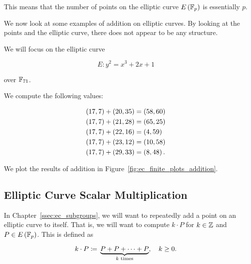 \noindent
This means that the number of points on the \gls{elliptic curve}
$E\left( \mathbb{F}_{p} \right)$ is essentially $p$.

We now look at some examples of addition on \glspl{elliptic curve}.
By looking at the points and the \gls{elliptic curve},
there does not appear to be any structure.

\begin{example}

We will focus on the \gls{elliptic curve}

\begin{equation}
    E: y^{2} = x^{3} + 2x + 1
\end{equation}

\noindent
over $\mathbb{F}_{71}$.

We compute the following values:

\begin{align}
    \left( 17,7 \right) + \left( 20,35 \right) &= \left( 58,60 \right)
        \nonumber\\
    \left( 17,7 \right) + \left( 21,28 \right) &= \left( 65,25 \right)
        \nonumber\\
    \left( 17,7 \right) + \left( 22,16 \right) &= \left( 4,59 \right)
        \nonumber\\
    \left( 17,7 \right) + \left( 23,12 \right) &= \left( 10,58 \right)
        \nonumber\\
    \left( 17,7 \right) + \left( 29,33 \right) &= \left( 8,48 \right).
\end{align}

\noindent
We plot the results of addition in Figure~\ref{fig:ec_finite_plots_addition}.


\end{example}


\subsection{Elliptic Curve Scalar Multiplication}
\label{ssec:ec_scalar_mult}

In Chapter~\ref{ssec:ec_subgroups}, we will want to repeatedly add
a point on an \gls{elliptic curve} to itself.
That is, we will want to compute $k\cdot P$ for $k\in\mathbb{Z}$
and $P\in E\left( \mathbb{F}_{p} \right)$.
This is defined as

\begin{equation}
    k\cdot P \coloneqq{} 
        \underbrace{P + P + \cdots + P}_{\text{$k$ times}}, \quad k\ge 0.
\end{equation}

